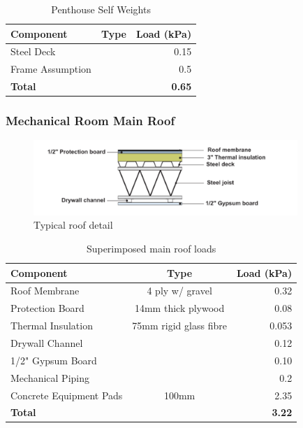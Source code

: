 \documentclass[12pt]{article}
\begin{document}
    \begin{table}[h!]
        \centering
    \begin{tabular}{lcr}
        \toprule
        \textbf{Component} & \textbf{Type} & \textbf{Load (kPa)}\\
        \midrule
        Steel Deck & & 0.15\\
        Frame Assumption & & 0.5\\
        \textbf{Total} & & \textbf{0.65}\\
        \bottomrule
    \end{tabular}
    \caption{Penthouse Self Weights}
    \label{tab:selfPent}
    \end{table}

\subsubsection{Mechanical Room Main Roof}
\begin{figure}
    \centering
\includegraphics[width=10cm]{Assets/Roof_Structure.png}
\caption{Typical roof detail}
\label{fig:roofStruct}
\end{figure}

\begin{table}[h!]
    \centering
    \begin{tabular}{lcr}
        \toprule
        \textbf{Component} & \textbf{Type} & \textbf{Load (kPa)}\\
        \midrule
        Roof Membrane & 4 ply w/ gravel & 0.32\\
        Protection Board & 14mm thick plywood & 0.08\\
        Thermal Insulation & 75mm rigid glass fibre & 0.053\\
        Drywall Channel &  & 0.12\\
        1/2" Gypsum Board &  & 0.10\\
        Mechanical Piping &  & 0.2\\
        Concrete Equipment Pads & 100mm & 2.35\\
        \textbf{Total} & & \textbf{3.22}\\
        \bottomrule
    \end{tabular}
    \caption{Superimposed main roof loads}
    \label{tab:superMain}
\end{table}
\end{document}
